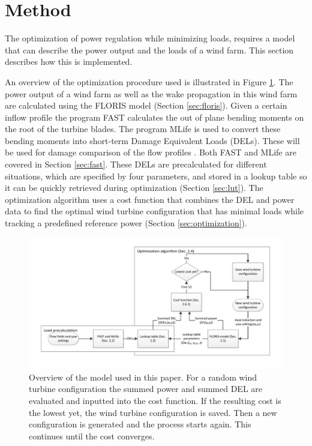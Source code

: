 \section{Method} \label{sec:method}
The optimization of power regulation while minimizing loads, requires a model that can describe the power output and the loads of a wind farm. This section describes how this is implemented.

An overview of the optimization procedure used is illustrated in Figure \ref{fig:optim}.
The power output of a wind farm as well as the wake propagation in this wind farm are calculated using the FLORIS model \cite{FLORIS} (Section \ref{sec:floris}). Given a certain inflow profile the program FAST calculates the out of plane bending moments on the root of the turbine blades. The program MLife is used to convert these bending moments into short-term Damage Equivalent Loads (DELs). These will be used for damage comparison of the flow profiles \cite{MLife}. Both FAST and MLife are covered in Section \ref{sec:fast}. These DELs are precalculated for different situations, which are specified by four parameters, and stored in a lookup table so it can be quickly retrieved during optimization (Section \ref{sec:lut}). The optimization algorithm uses a cost function that combines the DEL and power data to find the optimal wind turbine configuration that has minimal loads while tracking a predefined reference power (Section \ref{sec:optimization}).

\begin{figure}
	\includegraphics[width=\linewidth]{./Figures/OptimizationProcess.pdf}
	\caption{Overview of the model used in this paper. For a random wind turbine configuration the summed power and summed DEL are evaluated and inputted into the cost function. If the resulting cost is the lowest yet, the wind turbine configuration is saved. Then a new configuration is generated and the process starts again. This continues until the cost converges.}
	\label{fig:optim}
\end{figure}


